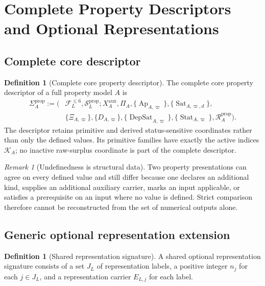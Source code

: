 \documentclass[11pt]{article}
\newcommand{\FVI}{\mathcal F_{L}^{\le 6}}
\newcommand{\Sprop}{\mathcal S_{L}^{\mathrm{prop}}}
\newcommand{\Ap}{\operatorname{Ap}}
\newcommand{\DepSat}{\operatorname{DepSat}}
\newcommand{\Sat}{\operatorname{Sat}}
\newcommand{\Stat}{\operatorname{Stat}}
\newcommand{\PropRec}{\mathcal R^{\mathrm{prop}}}
\theoremstyle{definition}
\newtheorem{definition}[theorem]{Definition}
\theoremstyle{remark}
\newtheorem{remark}[theorem]{Remark}
\begin{document}
\section{Complete Property Descriptors and Optional Representations}
\label{sec:descriptor-representation}

\subsection{Complete core descriptor}

\begin{definition}[Complete core property descriptor]
\label{def:descriptor}
The complete core property descriptor of a full property model \(A\) is
\[
\begin{aligned}
\Sigma_A^{\mathrm{prop}}:=\bigl(&\FVI,\Sprop;
X_A^{\mathrm{aux}},\Pi_A,
\{\Ap_{A,\varpi}\},\{\Sat_{A,\varpi,d}\},\\
&\{\Xi_{A,\varpi}\},\{D_{A,\varpi}\},
\{\DepSat_{A,\varpi}\},\{\Stat_{A,\varpi}\},\PropRec_A\bigr).
\end{aligned}
\]
The descriptor retains primitive and derived status-sensitive coordinates rather than only the defined values. Its primitive families have exactly the active indices \(\mathcal K_A\); no inactive raw-surplus coordinate is part of the complete descriptor.
\end{definition}

\begin{remark}[Undefinedness is structural data]
Two property presentations can agree on every defined value and still differ because one declares an additional kind, supplies an additional auxiliary carrier, marks an input applicable, or satisfies a prerequisite on an input where no value is defined.
Strict comparison therefore cannot be reconstructed from the set of numerical outputs alone.
\end{remark}

\subsection{Generic optional representation extension}

\begin{definition}[Shared representation signature]
A shared optional representation signature consists of a set \(J_L\) of representation labels, a positive integer \(n_j\) for each \(j\in J_L\), and a representation carrier \(E_{L,j}\) for each label.
\end{definition}
\end{document}
